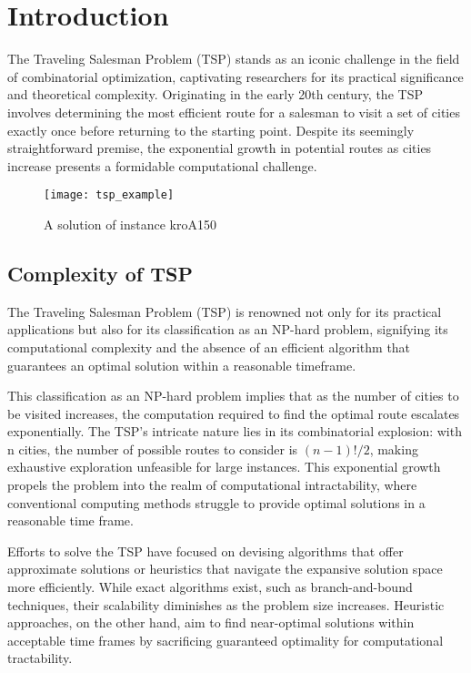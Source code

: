 \chapter{Introduction}

The Traveling Salesman Problem (TSP) stands as an iconic challenge in the field of combinatorial optimization, captivating researchers for its practical significance and theoretical complexity. Originating in the early 20th century, the TSP involves determining the most efficient route for a salesman to visit a set of cities exactly once before returning to the starting point. Despite its seemingly straightforward premise, the exponential growth in potential routes as cities increase presents a formidable computational challenge.

\begin{figure}[htbp]
	\centering
	\texttt{[image: tsp\_example]}
	\caption{A solution of instance kroA150}
\end{figure}

\section{Complexity of TSP}

The Traveling Salesman Problem (TSP) is renowned not only for its practical applications but also for its classification as an NP-hard problem, signifying its computational complexity and the absence of an efficient algorithm that guarantees an optimal solution within a reasonable timeframe.

This classification as an NP-hard problem implies that as the number of cities to be visited increases, the computation required to find the optimal route escalates exponentially. The TSP's intricate nature lies in its combinatorial explosion: with n cities, the number of possible routes to consider is $(n-1)!/2$, making exhaustive exploration unfeasible for large instances. This exponential growth propels the problem into the realm of computational intractability, where conventional computing methods struggle to provide optimal solutions in a reasonable time frame.

Efforts to solve the TSP have focused on devising algorithms that offer approximate solutions or heuristics that navigate the expansive solution space more efficiently. While exact algorithms exist, such as branch-and-bound techniques, their scalability diminishes as the problem size increases. Heuristic approaches, on the other hand, aim to find near-optimal solutions within acceptable time frames by sacrificing guaranteed optimality for computational tractability.

